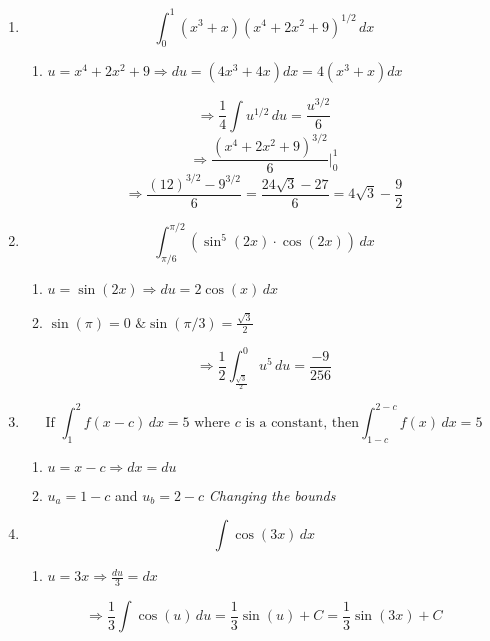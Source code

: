 \documentclass[12pt]{article}
\begin{document}
\begin{enumerate}
\item $$ \int_{0}^{1} (x^3+x)(x^4+2x^2+9)^{1/2} \, dx$$ 
\begin{enumerate}
    \item $u=x^4+2x^2+9 \Longrightarrow du = (4x^3+4x)dx = 4(x^3+x)dx$
\end{enumerate}
$$\Longrightarrow \frac{1}{4}\int u^{1/2} \, du = \frac{u^{3/2}}{6}$$
$$\Longrightarrow \frac{(x^4+2x^2+9)^{3/2}}{6}\bigg\rvert_{0}^{1}$$
$$\Longrightarrow \frac{(12)^{3/2}-9^{3/2}}{6} = \frac{24\sqrt{3}-27}{6} = 4\sqrt{3}-\frac{9}{2}$$

\item $$\int_{\pi/6}^{\pi/2} (\sin^5(2x)\cdot \cos(2x)) \, dx$$
\begin{enumerate}
    \item $u=\sin(2x) \Longrightarrow du=2\cos(x) \, dx$
    \item $\sin(\pi)=0 \text{ \& } \sin(\pi/3)=\frac{\sqrt{3}}{2}$ 
    
    
\end{enumerate}
$$ \Longrightarrow\frac{1}{2}\int_{\frac{\sqrt{3}}{2}}^{0} u^5 \, du = \frac{-9}{256}$$

\item $$ \text{If } \int_{1}^{2} f(x-c) \, dx=5 \text { where $c$ is a constant, then}\int_{1-c}^{2-c} f(x) \, dx =5$$
\begin{enumerate}
    \item $u=x-c \Longrightarrow dx=du$ 
    \item $u_a = 1-c$ and $u_b=2-c$ \textit{Changing the bounds}
\end{enumerate}


\item $$\int \cos(3x)\, dx$$

\begin{enumerate}
    \item $u=3x \Longrightarrow \frac{du}{3}=dx$
\end{enumerate}
$$\Longrightarrow \frac{1}{3}\int \cos(u) \, du = \frac{1}{3}\sin(u) +C= \frac{1}{3}\sin(3x) +C$$
\end{enumerate}
\end{document}
